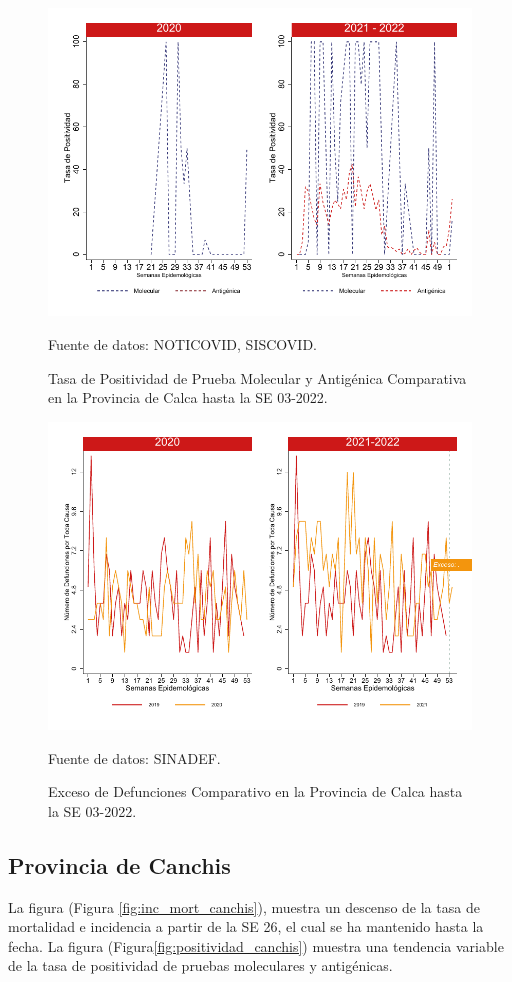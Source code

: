 \documentclass[12pt,a4paper,openany]{book}
\begin{document}
		\begin{figure}[h]
			\caption{Tasa de Positividad de Prueba Molecular y Antigénica Comparativa en la Provincia de Calca hasta la SE 03-2022.}\label{fig:positividad_calca}
			\begin{center}
				\includegraphics[width=0.7\linewidth]{../figuras/positividad_20_21_4}
			\end{center}
			{\footnotesize {Fuente de datos: NOTICOVID, SISCOVID.}}
		\end{figure}
		
		\begin{figure}[h]
			\caption{Exceso de Defunciones Comparativo en la Provincia de Calca hasta la SE 03-2022.}\label{fig:exceso_calca}
			\begin{center}
				\includegraphics[width=0.7\linewidth]{../figuras/exceso_4}
			\end{center}
			{\footnotesize {Fuente de datos: SINADEF.}}
		\end{figure}
		
		\clearpage
		
		\subsection*{Provincia de Canchis}
		\noindent La figura (Figura \ref{fig:inc_mort_canchis}),  muestra un descenso de la tasa de mortalidad e incidencia a partir de la SE 26, el cual se ha mantenido hasta la fecha. 
		\noindent La figura (Figura\ref{fig:positividad_canchis}) muestra una tendencia variable de la tasa de positividad de pruebas moleculares y antigénicas.
		
\end{document}
